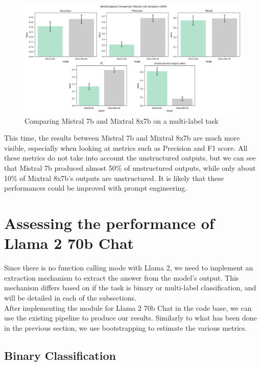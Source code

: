 \documentclass[11pt]{article}
\begin{document}
\begin{figure}[h]
    \centering
    \includegraphics[width=\linewidth]{images//mistral//multilabel/comparison.png}
    \caption{Comparing Mistral 7b and Mixtral 8x7b on a multi-label task}
    \label{fig:enter-label}
\end{figure}

This time, the results between Mistral 7b and Mixtral 8x7b are much more visible, especially when looking at metrics such as Precision and F1 score. All these metrics do not take into account the unstructured outputs, but we can see that Mistral 7b produced almost 50\% of unstructured outputs, while only about 10\% of Mixtral 8x7b's outputs are unstructured. It is likely that these performances could be improved with prompt engineering.

\section{Assessing the performance of Llama 2 70b Chat}

Since there is no function calling mode with Llama 2, we need to implement an extraction mechanism to extract the answer from the model's output. This mechanism differs based on if the task is binary or multi-label classification, and will be detailed in each of the subsections.\\

After implementing the module for Llama 2 70b Chat in the code base, we can use the existing pipeline to produce our results. Similarly to what has been done in the previous section, we use bootstrapping to estimate the various metrics.

\subsection{Binary Classification}
\end{document}
